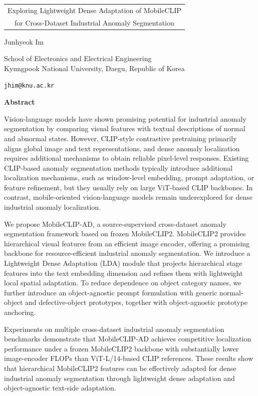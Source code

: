 \documentclass[10pt]{article}
\renewenvironment{abstract}
{
\par
\vspace{0.3em}
\centerline{\large\bfseries Abstract}
\vspace{0.8em}
\itshape
\noindent
}
{
\par
\normalfont
\vspace{0.8em}
}
\begin{document}
\begin{center}
\vspace*{0.25cm}
{\fontsize{14.5}{18}\selectfont\bfseries
\begin{tabular}{c}
Exploring Lightweight Dense Adaptation of MobileCLIP\\
for Cross-Dataset Industrial Anomaly Segmentation
\end{tabular}\par}
\vspace{0.75cm}
{\large Junhyeok Im\par}
\vspace{0.18cm}
{\normalsize
School of Electronics and Electrical Engineering\\
Kyungpook National University, Daegu, Republic of Korea\par}
\vspace{0.15cm}
{\small \texttt{jhim@knu.ac.kr}\par}
\vspace{0.65cm}
\end{center}

\begin{abstract}
Vision-language models have shown promising potential for industrial anomaly segmentation by comparing visual features with textual descriptions of normal and abnormal states. However, CLIP-style contrastive pretraining primarily aligns global image and text representations, and dense anomaly localization requires additional mechanisms to obtain reliable pixel-level responses. Existing CLIP-based anomaly segmentation methods typically introduce additional localization mechanisms, such as window-level embedding, prompt adaptation, or feature refinement, but they usually rely on large ViT-based CLIP backbones. In contrast, mobile-oriented vision-language models remain underexplored for dense industrial anomaly localization.

We propose MobileCLIP-AD, a source-supervised cross-dataset anomaly segmentation framework based on frozen MobileCLIP2. MobileCLIP2 provides hierarchical visual features from an efficient image encoder, offering a promising backbone for resource-efficient industrial anomaly segmentation. We introduce a Lightweight Dense Adaptation (LDA) module that projects hierarchical stage features into the text embedding dimension and refines them with lightweight local spatial adaptation. To reduce dependence on object category names, we further introduce an object-agnostic prompt formulation with generic normal-object and defective-object prototypes, together with object-agnostic prototype anchoring.

Experiments on multiple cross-dataset industrial anomaly segmentation benchmarks demonstrate that MobileCLIP-AD achieves competitive localization performance under a frozen MobileCLIP2 backbone with substantially lower image-encoder FLOPs than ViT-L/14-based CLIP references. These results show that hierarchical MobileCLIP2 features can be effectively adapted for dense industrial anomaly segmentation through lightweight dense adaptation and object-agnostic text-side adaptation.
\end{abstract}
\end{document}

